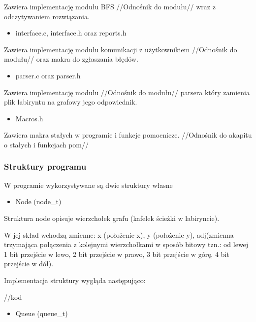 \documentclass[
]{article}
\begin{document}
Zawiera implementację modułu BFS //Odnośnik do modułu// wraz z
odczytywaniem rozwiązania.

\begin{itemize}
\item
  interface.c, interface.h oraz reports.h
\end{itemize}

Zawiera implementację modułu komunikacji z użytkownikiem //Odnośnik do
modułu// oraz makra do zgłaszania błędów.

\begin{itemize}
\item
  parser.c oraz parser.h
\end{itemize}

Zawiera implementację modułu //Odnośnik do modułu// parsera który
zamienia plik labiryntu na grafowy jego odpowiednik.

\begin{itemize}
\item
  Macros.h
\end{itemize}

Zawiera makra stałych w programie i funkcje pomocnicze. //Odnośnik do
akapitu o stałych i funkcjach pom//

\hypertarget{struktury-programu}{%
\subsubsection{Struktury programu}\label{struktury-programu}}

W programie wykorzystywane są dwie struktury własne

\begin{itemize}
\item
  Node (node\_t)
\end{itemize}

Struktura node opisuje wierzchołek grafu (kafelek ścieżki w labiryncie).

W jej skład wchodzą zmienne: x (położenie x), y (położenie y),
adj(zmienna trzymająca połączenia z kolejnymi wierzchołkami w sposób
bitowy tzn.: od lewej 1 bit przejście w lewo, 2 bit przejście w prawo, 3
bit przejście w górę, 4 bit przejście w dół).

Implementacja struktury wygląda następująco:

//kod

\begin{itemize}
\item
  Queue (queue\_t)
\end{itemize}
\end{document}
